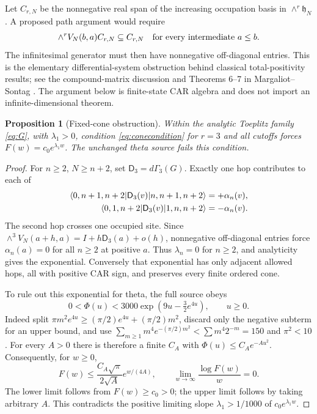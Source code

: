 \documentclass[11pt,letterpaper]{article}
\numberwithin{equation}{section}
\newtheorem{proposition}[theorem]{Proposition}
\theoremstyle{remark}
\newcommand{\ket}[1]{\lvert #1\rangle}
\newcommand{\bra}[1]{\langle #1\rvert}
\begin{document}
Let $C_{r,N}$ be the nonnegative real span of the increasing occupation
basis in $\wedge^r\mathfrak h_N$. A proposed path argument would require
\begin{equation}
 \wedge^rV_N(b,a)C_{r,N}\subseteq C_{r,N}
 \quad\hbox{for every intermediate }a\le b. \label{eq:conecondition}
\end{equation}
The infinitesimal generator must then have nonnegative off-diagonal
entries. This is the elementary differential-system obstruction behind
classical total-positivity results; see the compound-matrix discussion
and Theorems 6--7 in Margaliot--Sontag
\cite{MargaliotSontag180209590v2}. The argument below is finite-state
CAR algebra and does not import an infinite-dimensional theorem.

\begin{proposition}[Fixed-cone obstruction]
Within the analytic Toeplitz family \eqref{eq:G}, with $\lambda_1>0$,
condition \eqref{eq:conecondition} for $r=3$ and all cutoffs forces
$F(w)=c_0e^{\lambda_1w}$. The unchanged theta source fails this condition.
\end{proposition}
\begin{proof}
For $n\ge2$, $N\ge n+2$, set $\mathsf D_3=d\Gamma_3(G)$. Exactly one
hop contributes to each of
\begin{align}
 \bra{0,n+1,n+2}\mathsf D_3(v)\ket{n,n+1,n+2}&=+\alpha_n(v),\notag\\
 \bra{0,1,n+2}\mathsf D_3(v)\ket{1,n,n+2}&=-\alpha_n(v).
 \label{eq:oppositesigns}
\end{align}
The second hop crosses one occupied site. Since
$\wedge^3V_N(a+h,a)=I+h\mathsf D_3(a)+o(h)$, nonnegative off-diagonal
entries force $\alpha_n(a)=0$ for all $n\ge2$ at positive $a$.
Thus $\lambda_n=0$ for $n\ge2$, and analyticity gives the exponential.
Conversely that exponential has only adjacent allowed hops, all with
positive CAR sign, and preserves every finite ordered cone.

To rule out this exponential for theta, the full source obeys
\begin{equation}
 0<\Phi(u)<3000\exp(9u-\tfrac32e^{4u}),\qquad u\ge0.
 \label{eq:supergauss}
\end{equation}
Indeed split $\pi m^2e^{4u}\ge(\pi/2)e^{4u}+(\pi/2)m^2$, discard
only the negative subterm for an upper bound, and use
$\sum_{m\ge1}m^4e^{-(\pi/2)m^2}<\sum m^4 2^{-m}=150$ and $\pi^2<10$.
For every $A>0$ there is therefore a finite $C_A$ with
$\Phi(u)\le C_Ae^{-Au^2}$. Consequently, for $w\ge0$,
\begin{equation}
 F(w)\le\frac{C_A\sqrt\pi}{2\sqrt A}e^{w/(4A)},
 \qquad \lim_{w\to\infty}\frac{\log F(w)}w=0. \label{eq:nongrowth}
\end{equation}
The lower limit follows from $F(w)\ge c_0>0$; the upper limit follows
by taking arbitrary $A$. This contradicts the positive limiting slope
$\lambda_1>1/1000$ of $c_0e^{\lambda_1w}$.
\end{proof}
\end{document}
